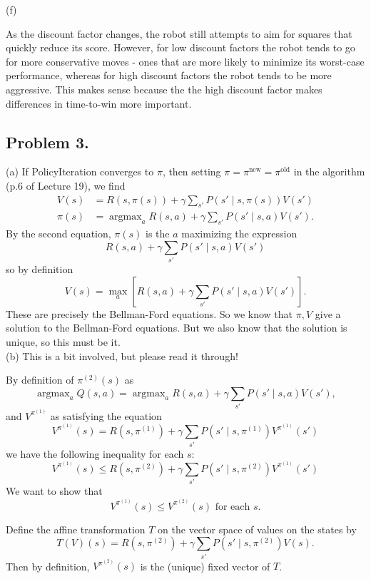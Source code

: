\documentclass[12pt]{article}
\DeclareMathOperator{\argmax}{argmax}
\theoremstyle{remark}
\begin{document}
(f)

As the discount factor changes, the robot still attempts to aim for squares that quickly reduce its score. However, for low discount factors the robot tends to go for more conservative moves - ones that are more likely to minimize its worst-case performance, whereas for high discount factors the robot tends to be more aggressive. This makes sense because the the high discount factor makes differences in time-to-win more important.



\subsection*{Problem 3.}(a) If PolicyIteration converges to $\pi$, then setting $\pi = \pi^{\text{new}} = \pi^{\text{old}}$ in the algorithm (p.6 of Lecture 19), we find
\begin{align*}
V(s) &= R(s, \pi(s)) + \gamma \sum_{s'} P(s' \mid s, \pi(s)) V(s') \\
\pi(s) &= \argmax_a R(s,a) + \gamma \sum_{s'} P(s' \mid s,a) V(s').
\end{align*}
By the second equation, $\pi(s)$ is the $a$ maximizing the expression 
\[
R(s, a) + \gamma \sum_{s'} P(s' \mid s, a) V(s')
\]
so by definition 
\[
V(s) = \max_a \left[ R(s,a) + \gamma \sum_{s'} P(s' \mid s,a) V(s') \right].
\]
These are precisely the Bellman-Ford equations. So we know that $\pi,V$ give a solution to the Bellman-Ford equations. But we also know that the solution is unique, so this must be it. \\

\noindent (b) This is a bit involved, but please read it through!

By definition of $\pi^{(2)}(s)$ as 
\[
\argmax_a Q(s,a) = \argmax_a R(s,a) + \gamma \sum_{s'} P(s' \mid s,a) V(s'),
\]
and $V^{\pi^{(1)}}$ as satisfying the equation 
\[
V^{\pi^{(1)}} (s) = R(s, \pi^{(1)}) + \gamma \sum_{s'} P(s' \mid s, \pi^{(1)} ) V^{\pi^{(1)}}(s')
\]
we have the following inequality for each $s$:
\begin{equation}\label{3eq2}
V^{\pi^{(1)}} (s) \leq R(s, \pi^{(2)}) + \gamma \sum_{s'} P(s' \mid s, \pi^{(2)} ) V^{\pi^{(1)}}(s') 
\end{equation}
We want to show that 
\begin{equation}\label{3eq3}
V^{\pi^{(1)}}(s) \leq V^{\pi^{(2)}}(s) \text{ for each }s.
\end{equation}

Define the affine transformation $T$ on the vector space of values on the states by 
\[
T(V)(s) =  R(s, \pi^{(2)}) + \gamma \sum_{s'} P(s' \mid s, \pi^{(2)} ) V(s).
\]
Then by definition, $V^{\pi^{(2)}}(s)$ is the (unique) fixed vector of $T$. 
\end{document}
